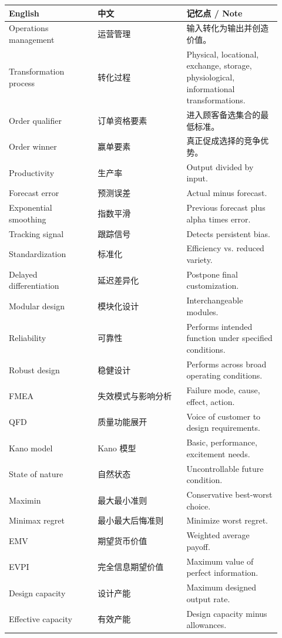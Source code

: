 \documentclass[11pt,a4paper]{ctexart}
\begin{document}
\begin{longtable}{L{0.3\linewidth}L{0.3\linewidth}L{0.32\linewidth}}
\toprule
\textbf{English} & \textbf{中文} & \textbf{记忆点 / Note} \\
\midrule
Operations management & 运营管理 & 输入转化为输出并创造价值。 \\
Transformation process & 转化过程 & Physical, locational, exchange, storage, physiological, informational transformations. \\
Order qualifier & 订单资格要素 & 进入顾客备选集合的最低标准。 \\
Order winner & 赢单要素 & 真正促成选择的竞争优势。 \\
Productivity & 生产率 & Output divided by input. \\
Forecast error & 预测误差 & Actual minus forecast. \\
Exponential smoothing & 指数平滑 & Previous forecast plus alpha times error. \\
Tracking signal & 跟踪信号 & Detects persistent bias. \\
Standardization & 标准化 & Efficiency vs. reduced variety. \\
Delayed differentiation & 延迟差异化 & Postpone final customization. \\
Modular design & 模块化设计 & Interchangeable modules. \\
Reliability & 可靠性 & Performs intended function under specified conditions. \\
Robust design & 稳健设计 & Performs across broad operating conditions. \\
FMEA & 失效模式与影响分析 & Failure mode, cause, effect, action. \\
QFD & 质量功能展开 & Voice of customer to design requirements. \\
Kano model & Kano 模型 & Basic, performance, excitement needs. \\
State of nature & 自然状态 & Uncontrollable future condition. \\
Maximin & 最大最小准则 & Conservative best-worst choice. \\
Minimax regret & 最小最大后悔准则 & Minimize worst regret. \\
EMV & 期望货币价值 & Weighted average payoff. \\
EVPI & 完全信息期望价值 & Maximum value of perfect information. \\
Design capacity & 设计产能 & Maximum designed output rate. \\
Effective capacity & 有效产能 & Design capacity minus allowances. \\

\end{longtable}
\end{document}
